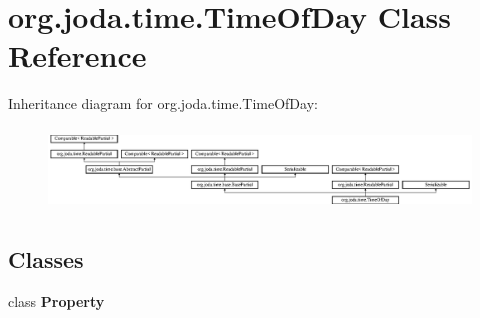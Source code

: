 \hypertarget{classorg_1_1joda_1_1time_1_1_time_of_day}{\section{org.\-joda.\-time.\-Time\-Of\-Day Class Reference}
\label{classorg_1_1joda_1_1time_1_1_time_of_day}
}
Inheritance diagram for org.\-joda.\-time.\-Time\-Of\-Day\-:\begin{figure}[H]
\begin{center}
\leavevmode
\includegraphics[height=2.211690cm]{classorg_1_1joda_1_1time_1_1_time_of_day}
\end{center}
\end{figure}
\subsection*{Classes}
\begin{DoxyCompactItemize}
\item 
class {\bfseries Property}
\end{DoxyCompactItemize}
